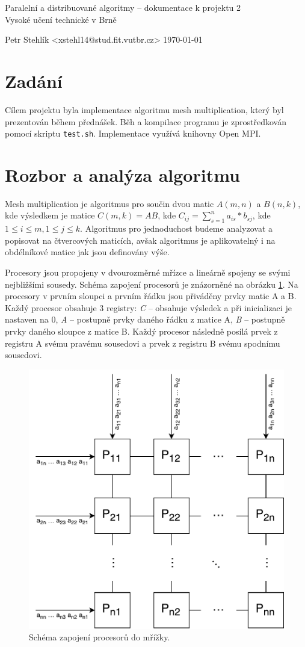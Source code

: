\documentclass[11pt,a4paper]{article}
\begin{document}
\begin{center}
	\large{Paralelní a distribuované algoritmy -- dokumentace k projektu 2}\\
	{Vysoké učení technické v Brně}
	\vspace{0.2cm}

	Petr Stehlík <xstehl14@stud.fit.vutbr.cz>     \today

\end{center}

\section{Zadání}

Cílem projektu byla implementace algoritmu mesh multiplication, který byl prezentován během přednášek. Běh a kompilace programu je zprostředkován pomocí skriptu \texttt{test.sh}. Implementace využívá knihovny Open MPI.

\section{Rozbor a analýza algoritmu}

Mesh multiplication je algoritmus pro součin dvou matic $A(m,n)$ a $B(n,k)$, kde výsledkem je matice $C (m,k) = AB$, kde $C_{ij} = \sum\limits_{s=1}^n a_{is} * b_{sj}$, kde $1 \leq i \leq m, 1 \leq j \leq k$. Algoritmus pro jednoduchost budeme analyzovat a popisovat na čtvercových maticích, avšak algoritmus je aplikovatelný i na obdélníkové matice jak jsou definovány výše.

Procesory jsou propojeny v dvourozměrné mřízce a lineárně spojeny se svými nejbližšími sousedy. Schéma zapojení procesorů je znázorněné na obrázku \ref{schema}. Na procesory v prvním sloupci a prvním řádku jsou přiváděny prvky matic A a B. Každý procesor obsahuje 3 registry: \textit{C} -- obsahuje výsledek a při inicializaci je nastaven na $0$, \textit{A} -- postupně prvky daného řádku z matice A, \textit{B} -- postupně prvky daného sloupce z matice B. Každý procesor následně posílá prvek z registru A svému pravému sousedovi a prvek z registru B svému spodnímu sousedovi.

\begin{figure}[h]
    \includegraphics[width=0.5\linewidth]{mesh}
    \centering
	\caption{Schéma zapojení procesorů do mřížky.}
    \label{schema}
\end{figure}
\end{document}
